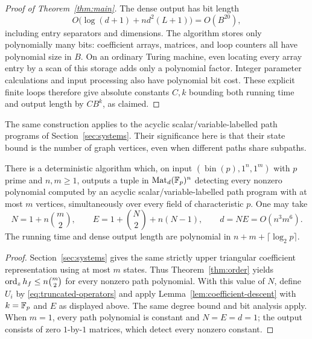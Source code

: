 \begin{proof}[Proof of Theorem~\ref{thm:main}]
 The dense output has bit length
 \[
  O\bigl(\log(d+1)+nd^2(L+1)\bigr)=O(B^{20}),
 \]
 including entry separators and dimensions.  The algorithm stores only
 polynomially many bits: coefficient arrays, matrices, and loop counters
 all have polynomial size in $B$.  On an ordinary Turing machine, even
 locating every array entry by a scan of this storage adds only a
 polynomial factor.  Integer parameter calculations and input processing
 also have polynomial bit cost.  These explicit finite loops therefore
 give absolute constants $C,k$ bounding both running time and output
 length by $CB^k$, as claimed.
\end{proof}

The same construction applies to the acyclic scalar/variable-labelled path
programs of Section~\ref{sec:systems}.  Their significance here is that their
state bound is the number of graph vertices, even when different paths share
subpaths.

\begin{corollary}\label{cor:path-programs}
 There is a deterministic algorithm which, on input
 $(\operatorname{bin}(p),1^n,1^m)$ with $p$ prime and $n,m\geq1$, outputs
 a tuple in $\operatorname{Mat}_d(\mathbb F_p)^n$ detecting every nonzero polynomial computed
 by an acyclic scalar/variable-labelled path program with at most $m$
 vertices, simultaneously over every field of characteristic $p$.
 One may take
 \[
  N=1+n\binom m2,\qquad
  E=1+\binom N2+n(N-1),\qquad d=NE=O(n^3m^6).
 \]
 The running time and dense output length are polynomial in
 $n+m+\lceil\log_2p\rceil$.
\end{corollary}

\begin{proof}
 Section~\ref{sec:systems} gives the same strictly upper triangular
 coefficient representation using at most $m$ states.  Thus
 Theorem~\ref{thm:order} yields $\operatorname{ord}_z h_f\leq n\binom m2$ for every
 nonzero path polynomial.  With this value of $N$, define $U_i$ by
 \eqref{eq:truncated-operators} and apply
 Lemma~\ref{lem:coefficient-descent} with $k=\mathbb F_p$ and $E$ as displayed
 above.  The same degree bound and bit analysis apply.  When $m=1$,
 every path polynomial is constant and $N=E=d=1$; the output consists of
 zero $1$-by-$1$ matrices, which detect every nonzero constant.
\end{proof}
